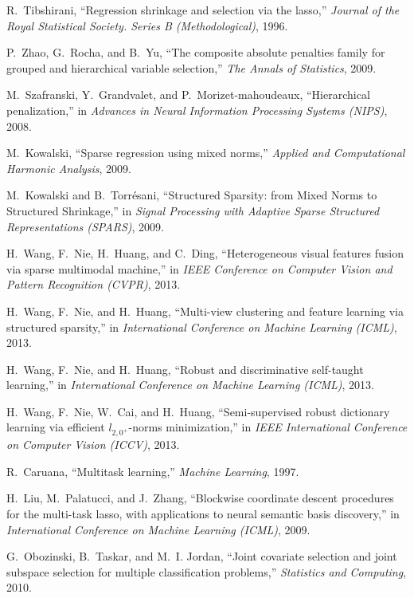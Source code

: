 \documentclass[9pt,technote,compsoc]{IEEEtran}
\begin{document}
\begin{thebibliography}{10}
	R.~Tibshirani, ``Regression shrinkage and selection via the lasso,''
	\emph{Journal of the Royal Statistical Society. Series B (Methodological)},
	1996.
	
	P.~Zhao, G.~Rocha, and B.~Yu, ``The composite absolute penalties family for
	grouped and hierarchical variable selection,'' \emph{The Annals of
		Statistics}, 2009.
	
	M.~Szafranski, Y.~Grandvalet, and P.~Morizet-mahoudeaux, ``Hierarchical
	penalization,'' in \emph{Advances in Neural Information Processing Systems
		(NIPS)}, 2008.
	
	M.~Kowalski, ``Sparse regression using mixed norms,'' \emph{Applied and
		Computational Harmonic Analysis}, 2009.
	
	M.~Kowalski and B.~Torr{\'e}sani, ``{Structured Sparsity: from Mixed Norms to
		Structured Shrinkage},'' in \emph{Signal Processing with Adaptive Sparse
		Structured Representations (SPARS)}, 2009.
	
	H.~Wang, F.~Nie, H.~Huang, and C.~Ding, ``Heterogeneous visual features fusion
	via sparse multimodal machine,'' in \emph{IEEE Conference on Computer Vision
		and Pattern Recognition (CVPR)}, 2013.
	
	H.~Wang, F.~Nie, and H.~Huang, ``Multi-view clustering and feature learning via
	structured sparsity,'' in \emph{International Conference on Machine Learning
		(ICML)}, 2013.
	
	H.~Wang, F.~Nie, and H.~Huang, ``Robust and discriminative self-taught
	learning,'' in \emph{International Conference on Machine Learning (ICML)},
	2013.
	
	H.~Wang, F.~Nie, W.~Cai, and H.~Huang, ``Semi-supervised robust dictionary
	learning via efficient $l_{2,0^{+}}$-norms minimization,'' in \emph{IEEE
		International Conference on Computer Vision (ICCV)}, 2013.
	
	R.~Caruana, ``Multitask learning,'' \emph{Machine Learning}, 1997.
	
	H.~Liu, M.~Palatucci, and J.~Zhang, ``Blockwise coordinate descent procedures
	for the multi-task lasso, with applications to neural semantic basis
	discovery,'' in \emph{International Conference on Machine Learning (ICML)},
	2009.
	
	G.~Obozinski, B.~Taskar, and M.~I. Jordan, ``Joint covariate selection and
	joint subspace selection for multiple classification problems,''
	\emph{Statistics and Computing}, 2010.
	

\end{thebibliography}
\end{document}
